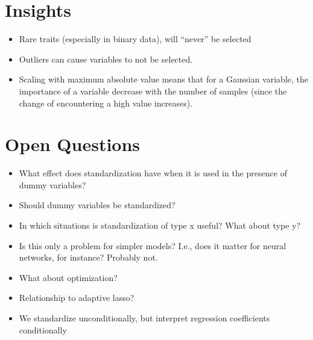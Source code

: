 \section{Insights}

\begin{itemize}
  \item Rare traits (especially in binary data), will ``never'' be selected
  \item Outliers can cause variables to not be selected.
  \item Scaling with maximum absolute value means that for a Gaussian variable, the importance of a variable decrease with the number of samples (since the change of encountering a high value increases).
\end{itemize}

\section{Open Questions}

\begin{itemize}
  \item What effect does standardization have when it is used in the presence of dummy variables?
  \item Should dummy variables be standardized?
  \item In which situations is standardization of type x useful? What about type y?
  \item Is this only a problem for simpler models? I.e., does it matter for neural networks, for instance? Probably not.
  \item What about optimization?
  \item Relationship to adaptive lasso?
  \item We standardize unconditionally, but interpret regression coefficients conditionally
\end{itemize}



